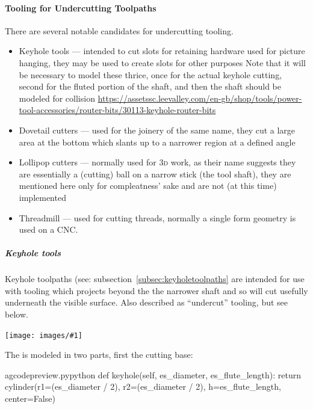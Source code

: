 \documentclass{ltxdoc}
\newcommand{\includeimage}[1]{\bigskip\noindent\texttt{[image: images/\#1]}\bigskip}
\begin{document}
\paragraph{Tooling for Undercutting Toolpaths}

There are several notable candidates for under\-cutting tooling. \label{para:undercuttooling} 

\begin{itemize}
\item Keyhole tools --- intended to cut slots for retaining hardware used for picture
                        hanging, they may be used to create slots for other purposes
                        Note that it will be necessary to model these thrice, once for
                        the actual keyhole cutting, second for the fluted portion of
                        the shaft, and then the shaft should be modeled for collision
                        \url{https://assetssc.leevalley.com/en-gb/shop/tools/power-tool-accessories/router-bits/30113-keyhole-router-bits} 
\item Dovetail cutters --- used for the joinery of the same name, they cut a large
                           area at the bottom which slants up to a narrower region
                           at a defined angle
\item Lollipop cutters --- normally used for \textsc{3d} work, as their name suggests
                           they are essentially a (cutting) ball on a narrow stick
                           (the tool shaft), they are mentioned here only for
                           compleatness' sake and are not (at this time) implemented
\item Threadmill --- used for cutting threads, normally a single form geometry is
                     used on a CNC.
\end{itemize}

\subparagraph{Keyhole tools}

Keyhole toolpaths (see: subsection~\ref{subsec:keyholetoolpaths} are intended for use with tooling which projects beyond the the narrower shaft and so will cut usefully underneath the visible surface. Also described as ``undercut'' tooling, but see below.

\includeimage{keyhole_router_bits.pdf}%

The  is modeled in two parts, first the cutting base:

\lstset{firstnumber=\thegcpy}
\begin{writecode}{a}{gcodepreview.py}{python}
    def keyhole(self, es_diameter, es_flute_length):
        return cylinder(r1=(es_diameter / 2), r2=(es_diameter / 2), h=es_flute_length, center=False)

\end{writecode}
\addtocounter{gcpy}{3}
\end{document}
